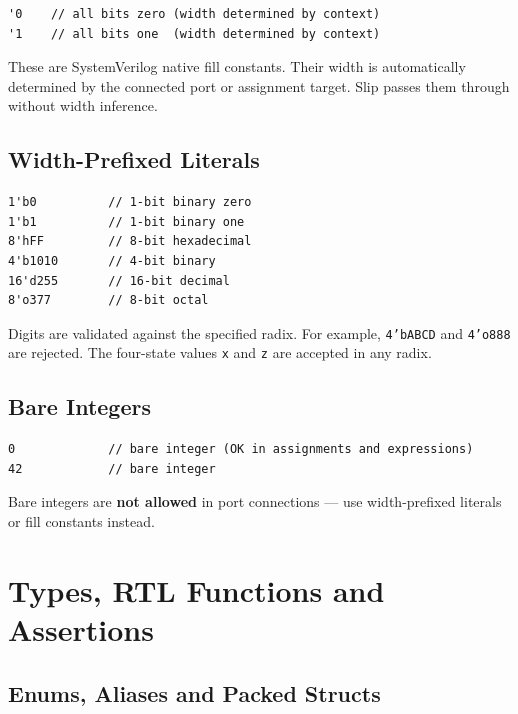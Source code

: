 \documentclass[lang=en,11pt]{elegantbook}
\newcommand{\code}[1]{\texttt{#1}}
\begin{document}
\begin{lstlisting}[language=Slip]
'0    // all bits zero (width determined by context)
'1    // all bits one  (width determined by context)
\end{lstlisting}

These are SystemVerilog native fill constants. Their width is automatically determined by the connected port or assignment target. Slip passes them through without width inference.

\section{Width-Prefixed Literals}

\begin{lstlisting}[language=Slip]
1'b0          // 1-bit binary zero
1'b1          // 1-bit binary one
8'hFF         // 8-bit hexadecimal
4'b1010       // 4-bit binary
16'd255       // 16-bit decimal
8'o377        // 8-bit octal
\end{lstlisting}

Digits are validated against the specified radix. For example, \code{4'bABCD} and \code{4'o888} are rejected. The four-state values \code{x} and \code{z} are accepted in any radix.

\section{Bare Integers}

\begin{lstlisting}[language=Slip]
0             // bare integer (OK in assignments and expressions)
42            // bare integer
\end{lstlisting}

Bare integers are \textbf{not allowed} in port connections --- use width-prefixed literals or fill constants instead.


\chapter{Types, RTL Functions and Assertions}

\section{Enums, Aliases and Packed Structs}
\end{document}
